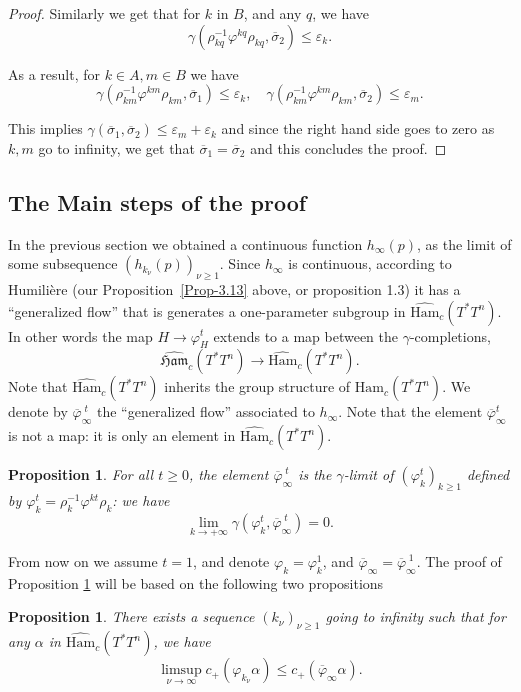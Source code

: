 \documentclass[JEP,XML,SOM,NoFloatCountersInSection,Unicode,published]{cedram}
\numberwithin{equation}{section}
\newcommand {\Ham}{{\mathfrak {Ham}}}
\newcommand {\DHam}{\mathrm{Ham}}
\newcommand{\gclHamc}[1]{\widehat{\Ham}_c(#1)}
\newcommand{\gclDHamc}[1]{\widehat{\DHam}_c(#1)}
\let \varpsi \varphi
\theoremstyle{plain}
\newtheorem{proposition}[theorem]{Proposition}
\theoremstyle{definition}
\theoremstyle{remark}
\begin{document}
\begin{proof}
Similarly we get that for $k$ in $B$, and any $q$, we have
\[
\gamma (\rho_{kq}^{-1} \varphi^{kq}\rho_{kq}, \overline \sigma_{2})\leq \varepsilon _{k}.
\]

As a result, for $k\in A, m\in B$ we have
\[
\gamma (\rho_{km}^{-1} \varphi^{km}\rho_{km}, \overline \sigma_{1})\leq \varepsilon _{k},\quad
\gamma (\rho_{km}^{-1} \varphi^{km}\rho_{km}, \overline \sigma_{2})\leq \varepsilon _{m}.
\]

This implies $\gamma (\overline\sigma_{1}, \overline \sigma_{2}) \leq \varepsilon _{m}+ \varepsilon _{k}$ and since the right hand side goes to zero as $k,m$ go to infinity, we get that $\overline \sigma_{1}=\overline \sigma_{2}$ and this concludes the proof.
\end{proof}

\subsection{The Main steps of the proof}\label{eop}

In the previous section we obtained a continuous function ${h}_{\infty}(p)$, as the limit of some subsequence $(h_{k_{\nu}}(p))_{\nu \geq 1}$. Since $h_{\infty}$ is
continuous, according to
Humilière (\cf our Proposition~\ref{Prop-3.13} above, or \cite{Humiliere} proposition 1.3) it has a ``generalized flow'' that is generates a one-parameter subgroup in $\gclDHamc{T^*T^n}$. In other words the map $H \to \varphi_{H}^t$ extends to a map between the $\gamma$-completions,
\[
\gclHamc{T^*T^n} \to \gclDHamc{T^*T^n}.
\]
Note that $\gclDHamc{T^*T^n}$ inherits the group structure of ${\DHam}_{c}(T^*T^n)$. We denote by ${\overline\varpsi}_\infty^{\; t}$ the
``generalized flow'' associated to $h_{\infty}$. Note that the element $\overline\varpsi_\infty^{t}$ is not a map: it is only an element in $\gclDHamc{T^*T^n}$.
\begin{proposition}\label{Prop-5.14}
For all $t\geq 0$, the element $\overline\varpsi_\infty^{\;t}$ is the $\gamma$-limit of $(\varphi_{k}^{t})_{k\geq 1}$ defined by $\varphi_{k}^{t}=
\rho^{-1}_{k} \varphi^{kt} \rho_{k}$: we have
\[
\lim_{k\to +\infty} \gamma (\varphi_{k}^{t}, \overline\varpsi_\infty^{\;t})=0.
\]
\end{proposition}
From now on we assume $t=1$, and denote $\varphi_{k}=\varphi_{k}^{1}$, and $\overline\varpsi_\infty=\overline\varpsi_\infty^{\;1}$. The proof of Proposition \ref{Prop-5.14} will be based on the following two propositions

\begin{proposition}\label{Prop-5.15} There exists a sequence $(k_{\nu})_{\nu\geq 1}$ going to infinity such that for any $\alpha$ in
$\gclDHamc{T^*T^n}$, we have
\[
\limsup_{\nu \to \infty}c_{+}(\varphi_{k_{\nu}} \alpha) \leq c_{+}(\overline\varpsi_\infty
\alpha).
\]
\end{proposition}
\end{document}
